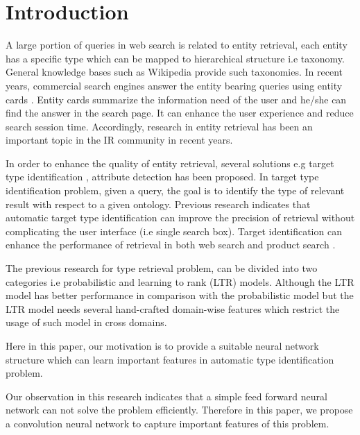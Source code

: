 \section{Introduction}\label{introduction}
\par
A large portion of queries in web search is related to entity retrieval, each entity has a specific type which can be mapped to hierarchical structure i.e taxonomy. General knowledge bases such as Wikipedia provide such taxonomies. In recent years, commercial search engines answer the entity bearing queries using entity cards \cite{Pound:2010:AOR:1772690.1772769}. Entity cards summarize the information need of the user and he/she can find the answer in the search page. It can enhance the user experience and reduce search session time. Accordingly, research in entity retrieval has been an important topic in the IR community in recent years.
\par
In order to enhance the quality of entity retrieval, several solutions e.g target type identification \cite{Garigliotti:2017:TTI:3077136.3080659}, attribute detection \cite{DargahiNobari:2018:QUV:3269206.3269245} has been proposed. In target type identification problem,  given a query, the goal is to identify the type of relevant result with respect to a given ontology. Previous research indicates that automatic target type identification can improve the precision of retrieval without complicating the user interface (i.e single search box). Target identification can enhance the performance of retrieval in both web search and product search \cite{Balog:2011:QME:2037661.2037667, Kaptein:2013:ECS:2405838.2405908, pehcevski2010entity}.
\par
The previous research for type retrieval problem, can be divided into two categories i.e probabilistic and learning to rank (LTR) models. Although the LTR model has better performance in comparison with the probabilistic model but the LTR model needs several hand-crafted domain-wise features which restrict the usage of such model in cross domains.

Here in this paper, our motivation is to provide a suitable neural network structure which can learn important features in automatic type identification problem.

Our observation in this research indicates that a simple feed forward neural network can not solve the problem efficiently. Therefore in this paper, we propose a convolution neural network to capture important features of this problem. 

